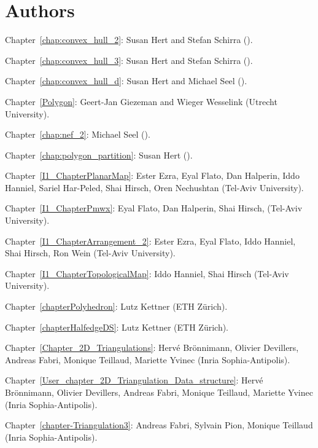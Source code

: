 \section*{Authors}

\noindent
Chapter~\ref{chap:convex_hull_2}: Susan Hert and Stefan Schirra 
().

\noindent
Chapter~\ref{chap:convex_hull_3}: Susan Hert and Stefan Schirra 
().

\noindent
Chapter~\ref{chap:convex_hull_d}: Susan Hert and Michael Seel 
().

\noindent
Chapter~\ref{Polygon}: Geert-Jan Giezeman and Wieger Wesselink 
(Utrecht University).

\noindent
Chapter~\ref{chap:nef_2}: Michael Seel 
().

\noindent
Chapter~\ref{chap:polygon_partition}: Susan Hert 
().

\noindent
Chapter~\ref{I1_ChapterPlanarMap}: Ester Ezra, Eyal Flato, Dan Halperin, 
Iddo Hanniel, Sariel Har-Peled, Shai Hirsch, Oren Nechushtan 
(Tel-Aviv University).

\noindent
Chapter~\ref{I1_ChapterPmwx}: Eyal Flato, Dan Halperin, Shai Hirsch,
(Tel-Aviv University).

\noindent
Chapter~\ref{I1_ChapterArrangement_2}: Ester Ezra, Eyal Flato, 
Iddo Hanniel, Shai Hirsch, Ron Wein (Tel-Aviv University).

\noindent
Chapter~\ref{I1_ChapterTopologicalMap}: Iddo Hanniel, Shai Hirsch 
(Tel-Aviv University).

\noindent
Chapter~\ref{chapterPolyhedron}: Lutz Kettner (ETH Z\"urich).

\noindent
Chapter~\ref{chapterHalfedgeDS}: Lutz Kettner (ETH Z\"urich).

\noindent
Chapter~\ref{Chapter_2D_Triangulations}: 
Herv\'e Br\"onnimann, Olivier Devillers, Andreas Fabri,
Monique Teillaud, Mariette Yvinec ({\sc Inria} Sophia-Antipolis).

\noindent
Chapter~\ref{User_chapter_2D_Triangulation_Data_structure}: 
Herv\'e Br\"onnimann, Olivier Devillers, Andreas Fabri,
Monique Teillaud, Mariette Yvinec ({\sc Inria} Sophia-Antipolis).


\noindent
Chapter~\ref{chapter-Triangulation3}: 
Andreas Fabri, Sylvain Pion, Monique Teillaud ({\sc Inria} Sophia-Antipolis).

